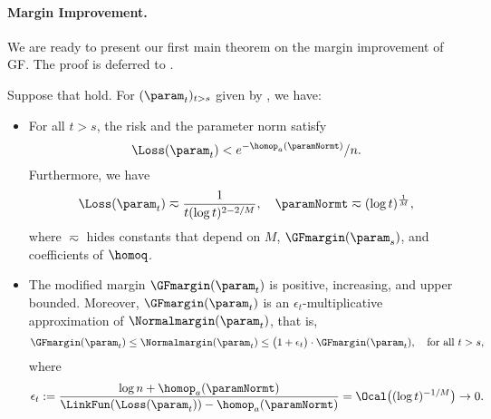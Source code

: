 \paragraph{Margin Improvement.}
We are ready to present our first main theorem on the margin improvement of GF.
The proof is deferred to . 
\begin{theorem}
\label{thm: Margin improving and convergence}
Suppose that  hold. 
For $(\param_t)_{t>s}$ given by  , we have:
\begin{itemize}[leftmargin=*]
\item %
For all $t>s$, the risk and the parameter norm satisfy
\begin{equation*}
     \Loss(\param_t) < e^{-\homop_a(\paramNormt)}/n.
\end{equation*}
Furthermore, %
we have
\begin{align*}
\Loss(\param_t) \eqsim  \frac{1}{t(\log t)^{2-2/M}},\quad 
\paramNormt \eqsim  (\log t)^{\frac{1}{M}} ,
\end{align*}
where $\eqsim$ hides constants that depend on $M$, $\GFmargin(\param_s)$, and coefficients of $\homoq$.
\item %
The modified margin $\GFmargin(\param_t)$ is positive, increasing, and upper bounded. Moreover,  
$\GFmargin(\param_t)$ is an $\epsilon_t$-multiplicative approximation of $\Normalmargin(\param_t)$, that is, 
\[
\GFmargin(\param_t) \le \Normalmargin(\param_t) \le \big(1+\epsilon_t\big) \cdot \GFmargin(\param_t),\quad  \text{for all}\ t>s, 
\]
where 
\[\epsilon_t :=  \frac{\log n + \homop_a(\paramNormt)}{\LinkFun(\Loss(\param_t))-\homop_a(\paramNormt)}  =\Ocal \big((\log t)^{-1/M}\big)\to 0.\] 
\end{itemize}
\end{theorem}

